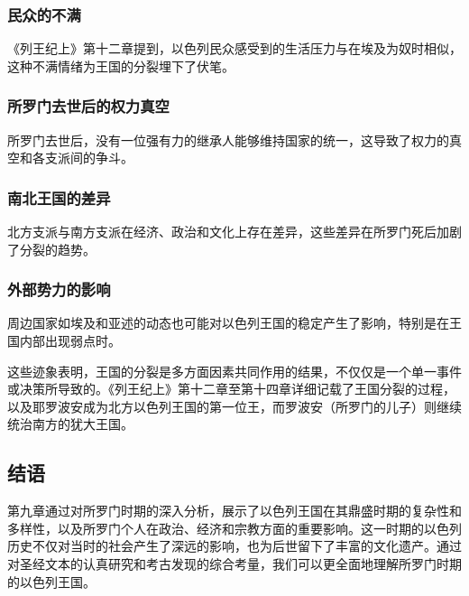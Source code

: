 \documentclass[12pt, a4paper]{ctexart}
\begin{document}
\subsubsection{民众的不满}
《列王纪上》第十二章提到，以色列民众感受到的生活压力与在埃及为奴时相似，这种不满情绪为王国的分裂埋下了伏笔。

\subsubsection{所罗门去世后的权力真空}
所罗门去世后，没有一位强有力的继承人能够维持国家的统一，这导致了权力的真空和各支派间的争斗。

\subsubsection{南北王国的差异}
北方支派与南方支派在经济、政治和文化上存在差异，这些差异在所罗门死后加剧了分裂的趋势。

\subsubsection{外部势力的影响}
周边国家如埃及和亚述的动态也可能对以色列王国的稳定产生了影响，特别是在王国内部出现弱点时。

这些迹象表明，王国的分裂是多方面因素共同作用的结果，不仅仅是一个单一事件或决策所导致的。《列王纪上》第十二章至第十四章详细记载了王国分裂的过程，以及耶罗波安成为北方以色列王国的第一位王，而罗波安（所罗门的儿子）则继续统治南方的犹大王国。


\subsection{结语}
第九章通过对所罗门时期的深入分析，展示了以色列王国在其鼎盛时期的复杂性和多样性，以及所罗门个人在政治、经济和宗教方面的重要影响。这一时期的以色列历史不仅对当时的社会产生了深远的影响，也为后世留下了丰富的文化遗产。通过对圣经文本的认真研究和考古发现的综合考量，我们可以更全面地理解所罗门时期的以色列王国。
\end{document}

